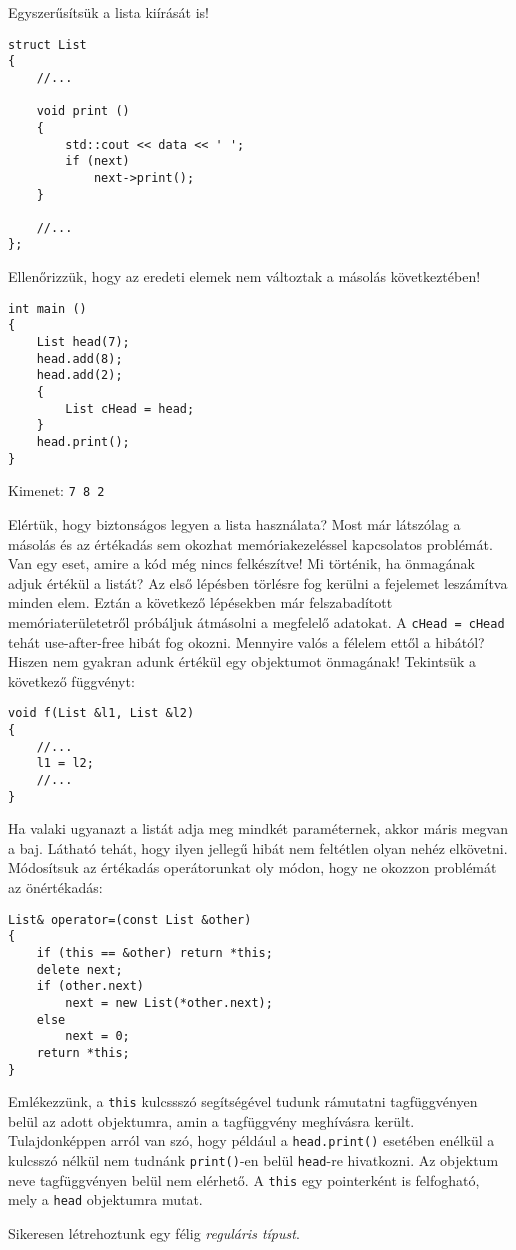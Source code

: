 \documentclass[../cpp_book/cpp_book.tex]{subfiles}
\begin{document}
	Egyszerűsítsük a lista kiírását is!
	\begin{lstlisting}
struct List
{
	//...
	
	void print ()
	{
		std::cout << data << ' ';
		if (next)
			next->print();
	}
	
	//...
};
	\end{lstlisting}
	Ellenőrizzük, hogy az eredeti elemek nem változtak a másolás következtében!
	\begin{lstlisting}
int main ()
{
	List head(7);
	head.add(8);
	head.add(2);
	{
		List cHead = head;
	}
	head.print();
}
	\end{lstlisting}
	Kimenet: \texttt{7 8 2}
	
	Elértük, hogy biztonságos legyen a lista használata? Most már látszólag a másolás és az értékadás sem okozhat memóriakezeléssel kapcsolatos problémát. Van egy eset, amire a kód még nincs felkészítve! Mi történik, ha önmagának adjuk értékül a listát? Az első lépésben törlésre fog kerülni a fejelemet leszámítva minden elem. Eztán a következő lépésekben már felszabadított memóriaterületetről próbáljuk átmásolni a megfelelő adatokat. A \texttt{cHead = cHead} tehát use-after-free hibát fog okozni. Mennyire valós a félelem ettől a hibától? Hiszen nem gyakran adunk értékül egy objektumot önmagának! Tekintsük a következő függvényt:
	\begin{lstlisting}
void f(List &l1, List &l2)
{
	//...
	l1 = l2;
	//...
}
	\end{lstlisting}
	Ha valaki ugyanazt a listát adja meg mindkét paraméternek, akkor máris megvan a baj. Látható tehát, hogy ilyen jellegű hibát nem feltétlen olyan nehéz elkövetni.  Módosítsuk az értékadás operátorunkat oly módon, hogy ne okozzon problémát az önértékadás:
\begin{lstlisting}
List& operator=(const List &other)
{
	if (this == &other) return *this;
	delete next;
	if (other.next)
		next = new List(*other.next);
	else
		next = 0;
	return *this;
}
\end{lstlisting}
  Emlékezzünk, a \texttt{this} kulcssszó segítségével tudunk rámutatni tagfüggvényen belül az adott objektumra, amin a tagfüggvény meghívásra került. Tulajdonképpen arról van szó, hogy például a \texttt{head.print()} esetében enélkül a kulcsszó nélkül nem tudnánk \texttt{print()}-en belül \texttt{head}-re hivatkozni. Az objektum neve tagfüggvényen belül nem elérhető. A \texttt{this} egy pointerként is felfogható, mely a \texttt{head} objektumra mutat.
	\medskip

	Sikeresen létrehoztunk egy félig \textit{reguláris típust}.
	\medskip
	
\end{document}
